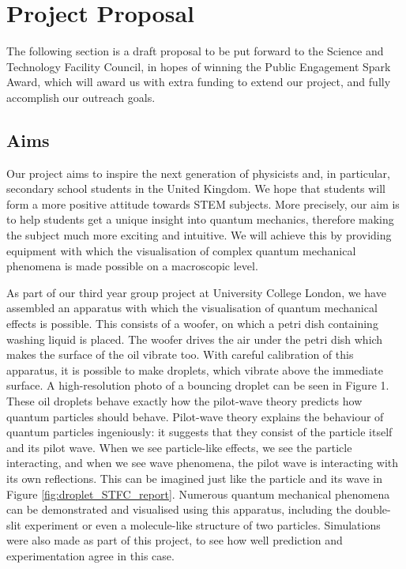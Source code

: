 \section{Project Proposal}
The following section is a draft proposal to be put forward to the  Science and Technology Facility Council, in hopes of winning the Public Engagement Spark Award, which will award us with extra funding to extend our project, and fully accomplish our outreach goals. 
\subsection{Aims}

Our project aims to inspire the next generation of physicists and, in particular, secondary school students in the United Kingdom. We hope that students will form a more positive attitude towards STEM subjects. More precisely, our aim is to help students get a unique insight into quantum mechanics, therefore making the subject much more exciting and intuitive. We will achieve this by providing equipment with which the visualisation of complex quantum mechanical phenomena is made possible on a macroscopic level.

As part of our third year group project at University College London, we have assembled an apparatus with which the visualisation of quantum mechanical effects is possible. This consists of a woofer, on which a petri dish containing washing liquid is placed. The woofer drives the air under the petri dish which makes the surface of the oil vibrate too. With careful calibration of this apparatus, it is possible to make droplets, which vibrate above the immediate surface. A high-resolution photo of a bouncing droplet can be seen in Figure 1. These oil droplets behave exactly how the pilot-wave theory predicts how quantum particles should behave. Pilot-wave theory explains the behaviour of quantum particles ingeniously: it suggests that they consist of the particle itself and its pilot wave. When we see particle-like effects, we see the particle interacting, and when we see wave phenomena, the pilot wave is interacting with its own reflections. This can be imagined just like the particle and its wave in Figure \ref{fig:droplet_STFC_report}. Numerous quantum mechanical phenomena can be demonstrated and visualised using this apparatus, including the double-slit experiment or even a molecule-like structure of two particles. Simulations were also made as part of this project, to see how well prediction and experimentation agree in this case.  

